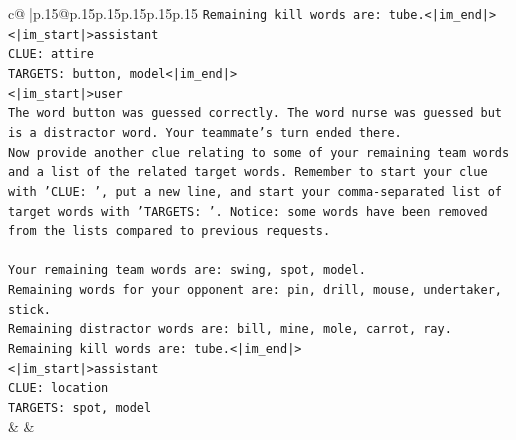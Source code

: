 \documentclass{article}
\begin{document}
{\begin{supertabular}{c@{$\;$}|p{.15\linewidth}@{}p{.15\linewidth}p{.15\linewidth}p{.15\linewidth}p{.15\linewidth}p{.15\linewidth}}
{{{\texttt{Remaining kill words are: tube.<|im\_end|>} \\
\texttt{<|im\_start|>assistant} \\
\texttt{CLUE: attire} \\
\texttt{TARGETS: button, model<|im\_end|>} \\
\texttt{<|im\_start|>user} \\
\texttt{The word button was guessed correctly. The word nurse was guessed but is a distractor word. Your teammate's turn ended there.} \\
\texttt{Now provide another clue relating to some of your remaining team words and a list of the related target words. Remember to start your clue with 'CLUE: ', put a new line, and start your comma{-}separated list of target words with 'TARGETS: '. Notice: some words have been removed from the lists compared to previous requests.} \\
\\ 
\texttt{Your remaining team words are: swing, spot, model.} \\
\texttt{Remaining words for your opponent are: pin, drill, mouse, undertaker, stick.} \\
\texttt{Remaining distractor words are: bill, mine, mole, carrot, ray.} \\
\texttt{Remaining kill words are: tube.<|im\_end|>} \\
\texttt{<|im\_start|>assistant} \\
\texttt{CLUE: location} \\
\texttt{TARGETS: spot, model} \\
            }
        }
    }
    & & \\ \\


\end{supertabular}}
\end{document}
